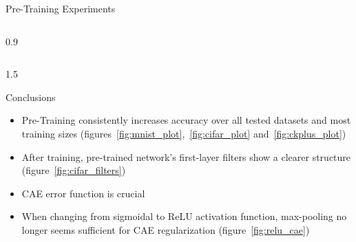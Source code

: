 \documentclass[final]{beamer}
\newlength{\onecolwid}
\newlength{\threecolwid}
\begin{document}
\begin{frame}[t]
\begin{columns}[t]
\begin{column}{\threecolwid}
\begin{alertblock}{Pre-Training Experiments}
\begin{columns}[t, totalwidth=0.9\threecolwid]
\begin{column}{0.9\onecolwid}
\begin{block}{}
	\end{block}



	\end{column}
\end{columns}


\end{alertblock}

\begin{alertblock} %

\begin{columns}[t]

	\begin{column}{1.5\onecolwid}

		\begin{block}{Conclusions}

			\begin{itemize}
				\item Pre-Training consistently increases accuracy over all tested datasets and most training sizes (figures~\ref{fig:mnist_plot},~\ref{fig:cifar_plot} and~\ref{fig:ckplus_plot})

				\item After training, pre-trained network's first-layer filters show a clearer structure (figure~\ref{fig:cifar_filters})

				\item CAE error function is crucial

				\item When changing from sigmoidal to ReLU activation function, max-pooling no longer seems sufficient for CAE regularization (figure~\ref{fig:relu_cae}) 

			\end{itemize}


\end{block}
\end{column}
\end{columns}
\end{alertblock}
\end{column}
\end{columns}
\end{frame}
\end{document}
